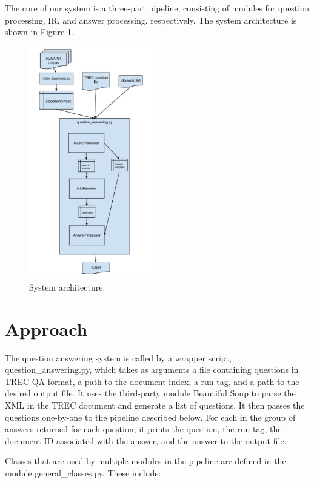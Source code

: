 \documentclass[11pt]{article}
\begin{document}
The core of our system is a three-part pipeline, consisting of modules for question processing, IR, and answer processing, respectively. The system architecture is shown in Figure 1.

\begin{figure}
  \centering
    \includegraphics[width=0.5\textwidth]{system_architecture.jpg}
 \caption{System architecture.}
\end{figure}

\section{Approach}

The question answering system is called by a wrapper script, question\_answering.py, which takes as arguments a file containing questions in TREC QA format, a path to the document index, a run tag, and a path to the desired output file. It uses the third-party module Beautiful Soup to parse the XML in the TREC document and generate a list of questions. It then passes the questions one-by-one to the pipeline described below. For each in the group of answers returned for each question, it prints the question, the run tag, the document ID associated with the answer, and the answer to the output file.

Classes that are used by multiple modules in the pipeline are defined in the module general\_classes.py. These include:
\end{document}
